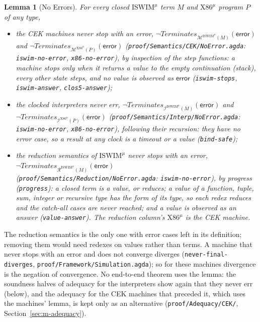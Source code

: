 \documentclass[10pt]{article}
\theoremstyle{acmplain}
\newtheorem{lemma}[theorem]{Lemma}
\newcommand{\key}[1]{\mathsf{#1}}
\newcommand{\error}{\key{error}}
\newcommand{\Mach}[1]{\mathcal{M}^{#1}}
\newcommand{\Term}{\mathit{Terminates}}
\newcommand{\Interp}[1]{\mathcal{I}^{#1}}
\newcommand{\Ml}[1]{\textrm{#1}^{\mu}}                  %
\begin{document}
\begin{lemma}[No Errors]\label{lem:m-no-error}\sloppy
For every closed $\Ml{ISWIM}$ term $M$ and $\Ml{X86}$ program $P$ of any type,
\begin{itemize}
\item the CEK machines never stop with an error,
  $\neg\Term_{\Mach{\Ml{ISWIM}}(M)}(\error)$ and
  $\neg\Term_{\Mach{\Ml{X86}}(P)}(\error)$
  (\texttt{proof/\allowbreak Semantics/\allowbreak CEK/\allowbreak NoError.agda}:
  \texttt{iswim-no-error}, \texttt{x86-no-error}), by inspection of the step functions: a machine
  stops only when it returns a value to the empty continuation (stack),
  every other state steps, and no value is observed as $\error$
  (\texttt{iswim-stops}, \texttt{iswim-answer}, \texttt{clos5-answer});
\item the clocked interpreters never err,
  $\neg\Term_{\Interp{\Ml{ISWIM}}(M)}(\error)$ and
  $\neg\Term_{\Interp{\Ml{X86}}(P)}(\error)$
  (\texttt{proof/Semantics/Interp/NoError.agda}: \texttt{iswim-no-error},
  \texttt{x86-no-error}), following their recursion: they have no error
  case, so a result at any clock is a timeout or a value
  (\texttt{bind-safe});
\item the reduction semantics of $\Ml{ISWIM}$ never stops with an error,
  $\neg\Term_{\mathcal{R}^{\Ml{ISWIM}}(M)}(\error)$
  (\texttt{proof/Semantics/Reduction/NoError.agda}: \texttt{iswim-no-error}),
  by progress (\texttt{progress}): a closed term is a value, or reduces; a
  value of a function, tuple, sum, integer or recursive type has the form
  of its type, so each redex reduces and the catch-all cases are never
  reached; and a value is observed as an answer (\texttt{value-answer}).
  The reduction column's $\Ml{X86}$ is the CEK machine.
\end{itemize}
\end{lemma}
The reduction semantics is the only one with error cases left in its
definition; removing them would need redexes on values rather than terms.
A machine that never stops with an error and does not converge diverges
(\texttt{never-final-diverges}, \texttt{proof/Framework/Simulation.agda});
so for these machines divergence is the negation of convergence. No
end-to-end theorem uses the lemma: the soundness halves of adequacy for
the interpreters show again that they never err (below), and the
adequacy for the CEK machines that preceded it, which uses the
machines' lemma, is kept only as an alternative
(\texttt{proof/Adequacy/CEK/}, Section~\ref{sec:m-adequacy}).
\end{document}
